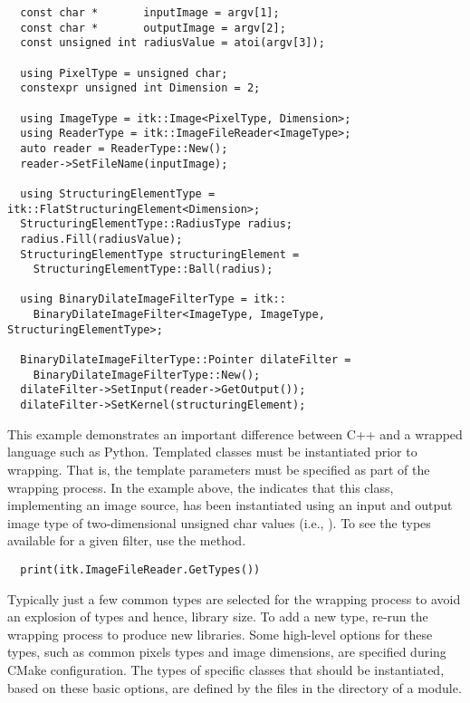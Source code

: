 \small
\begin{verbatim}
  const char *       inputImage = argv[1];
  const char *       outputImage = argv[2];
  const unsigned int radiusValue = atoi(argv[3]);

  using PixelType = unsigned char;
  constexpr unsigned int Dimension = 2;

  using ImageType = itk::Image<PixelType, Dimension>;
  using ReaderType = itk::ImageFileReader<ImageType>;
  auto reader = ReaderType::New();
  reader->SetFileName(inputImage);

  using StructuringElementType = itk::FlatStructuringElement<Dimension>;
  StructuringElementType::RadiusType radius;
  radius.Fill(radiusValue);
  StructuringElementType structuringElement =
    StructuringElementType::Ball(radius);

  using BinaryDilateImageFilterType = itk::
    BinaryDilateImageFilter<ImageType, ImageType, StructuringElementType>;

  BinaryDilateImageFilterType::Pointer dilateFilter =
    BinaryDilateImageFilterType::New();
  dilateFilter->SetInput(reader->GetOutput());
  dilateFilter->SetKernel(structuringElement);
\end{verbatim}
\normalsize

This example demonstrates an important difference between C++ and a wrapped
language such as Python. Templated classes must be instantiated prior to
wrapping. That is, the template parameters must be specified as part of the
wrapping process. In the example above, the
 indicates that this class, implementing
an image source, has been
instantiated using an input and output image type of two-dimensional unsigned
char values (i.e., ). To see the types available for a given filter,
use the  method.

\small
\begin{verbatim}
  print(itk.ImageFileReader.GetTypes())
\end{verbatim}
\normalsize

Typically just a few common types are selected for the wrapping process to
avoid an explosion of types and hence, library size. To add a new type, re-run
the wrapping process to produce new libraries. Some high-level options for
these types, such as common pixels types and image dimensions, are specified
during CMake configuration.  The types of specific classes that should be
instantiated, based on these basic options, are defined by the 
files in the  directory of a module.

